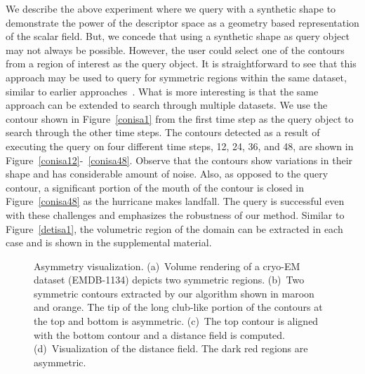 \documentclass[review,journal]{vgtc}         %
\begin{document}
We describe the above experiment where we query with
a synthetic shape to demonstrate the power of the descriptor space as a geometry based representation 
of the scalar field. But, we concede that using a synthetic shape as query object may not always be 
possible. However, the user could select one of the contours from a region of interest as the query
object. It is straightforward to see that this approach may be used
to query for symmetric regions within the same dataset, similar to earlier approaches~\cite{ThomN13,MasoodTN13}.
What is more interesting is that the same approach can be extended to search through multiple datasets.
We use the contour shown in Figure~\ref{conisa1} from the first time step as the query object to search through 
the other time steps. The contours detected as a result of executing the query on four different time 
steps, 12, 24, 36, and 48, are shown in Figure~\ref{conisa12}-~\ref{conisa48}. Observe that
the contours show variations in their shape and has considerable amount of noise. 
Also, as opposed to the query contour, a significant portion
of the mouth of the contour is closed in Figure~\ref{conisa48} as the hurricane makes landfall.
The query is successful even with these challenges and emphasizes the robustness of our method.
Similar to Figure~\ref{detisa1}, the volumetric region of the domain can be extracted in 
each case and is shown in the supplemental material.
\begin{figure*}[t]
	\centering
	\caption{Asymmetry visualization. (a)~Volume rendering of a cryo-EM dataset (EMDB-1134) 
	depicts two symmetric regions. (b)~Two symmetric contours extracted by our algorithm shown
in maroon and orange. The tip of the long club-like portion of the contours at the top and bottom is asymmetric.
(c)~The top contour is aligned with the bottom contour and a distance field is computed. (d)~Visualization
of the distance field. The dark red regions are asymmetric.}
\end{figure*}
\end{document}

